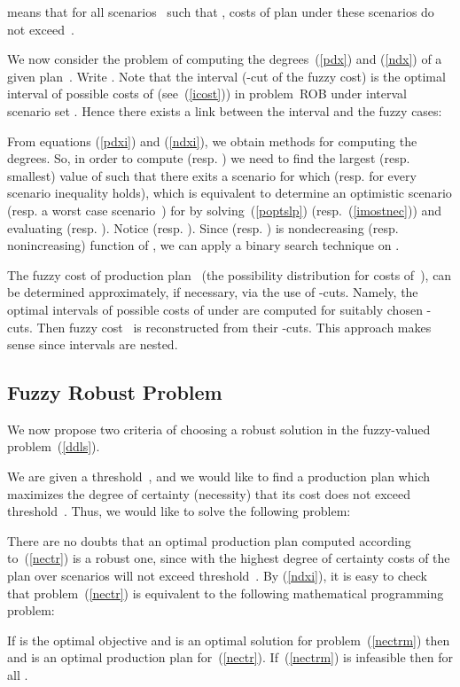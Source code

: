 \documentclass[11pt]{article}
\begin{document}
means that for all scenarios~
such that , costs of plan  under these scenarios 
do not exceed~.


We now consider the problem of computing
the degrees~(\ref{pdx}) and (\ref{ndx})
 of a given plan~. 
 Write . Note that the interval 
(-cut of the fuzzy cost) is the optimal 
interval of possible costs of  (see~(\ref{icost}))
in problem~\textsc{ROB} under interval scenario set .
Hence there exists a link between the interval and the fuzzy cases:

From equations  (\ref{pdxi}) and (\ref{ndxi}), we obtain methods for
computing the degrees. 
So, in order 
to compute 
 (resp. )
we need to find the largest  (resp. smallest) value of  such that
there exits a scenario  for which 
(resp. 
for every scenario  inequality  holds),
which is equivalent to
determine an optimistic scenario  
(resp. a worst 
case scenario~)
for 
by solving~(\ref{poptslp}) (resp.~(\ref{imostnec})) and
evaluating 
(resp. ). Notice 
(resp. ).
Since   (resp. ) is nondecreasing 
(resp. nonincreasing)
function
of ,
we can apply a binary search technique on .

The fuzzy cost of production plan~ 
(the possibility distribution for costs of~), 
can be determined approximately, if necessary,
via the use of -cuts. Namely, 
the optimal intervals of possible costs of  under 
are computed for
suitably chosen -cuts.
Then  fuzzy cost~ is reconstructed from their
-cuts. This
approach makes sense since intervals  are nested.

\subsection{Fuzzy Robust Problem}

We now propose  two  criteria of choosing a
robust solution in the fuzzy-valued
problem~(\ref{ddls}).

We are given a threshold~, and we would like to find a production plan
which maximizes 
the degree of certainty (necessity)  that its cost does not exceed  threshold~. Thus, we
would like to solve the following problem:

There are no doubts that an optimal production plan computed according to~(\ref{nectr}) is
a robust one, since with the highest
degree of certainty  costs of the plan over scenarios 
will not exceed threshold~. 
By (\ref{ndxi}), it is easy to check that problem~(\ref{nectr}) is equivalent to the following 
mathematical programming problem:

If  is the optimal objective and  is an optimal solution for
problem~(\ref{nectrm}) 
then 
and  is an optimal production plan for~(\ref{nectr}).
 If~(\ref{nectrm}) is
infeasible then 
 for all . 
\end{document}
